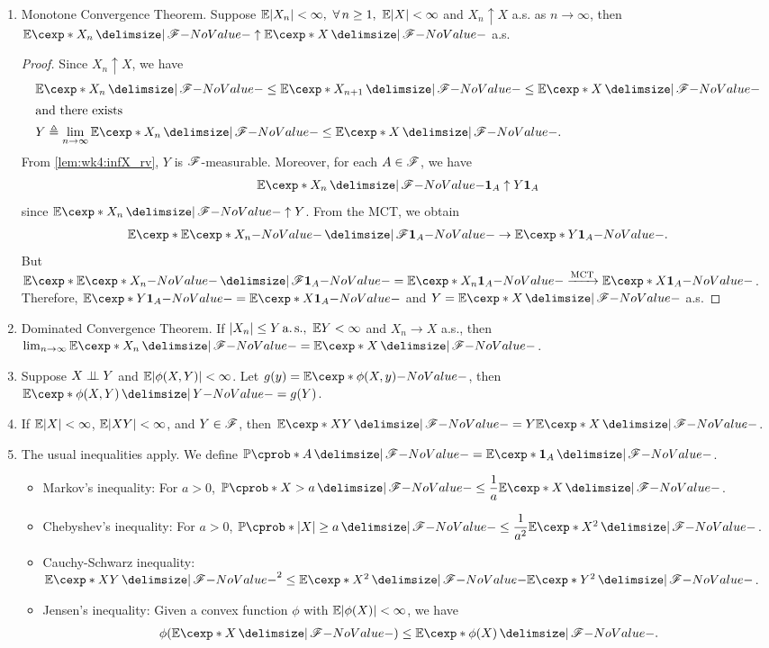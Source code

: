 \documentclass[12pt]{article}
\begin{document}
\begin{enumerate}[1.]
\item Monotone Convergence Theorem. Suppose $\E |X_n|<\infty,\ \forall n\geq 1,\ \E|X|<\infty$ and $X_n \uparrow X$ a.s. as $n \to \infty$, then $\E[X_n \given \scF] \uparrow \E[X \given \scF]$ a.s.
\begin{proof}
Since $X_n \uparrow X$, we have
\begin{align*}
&\E[X_n \given \scF]\leq \E[X_{n+1} \given \scF]\leq \E[X \given \scF]\\
\intertext{and there exists}
&Y\triangleq \lim_{n\to \infty} \E [X_n \given \scF]\leq \E [X \given \scF].
\end{align*}
From \cref{lem:wk4:infX_rv}, $Y$ is $\mathscr{F}$-measurable. Moreover, for each $A\in\mathscr{F}$, we have
\begin{align*}
\E[X_n \given \scF]\indicatore{A} \uparrow  Y\indicatore{A}
\end{align*}
since $\E[X_n \given \scF] \uparrow Y$. From the MCT, we obtain
\begin{align*}
\E[\E[X_n]{\scF}\indicatore{A}] \to \E[Y\indicatore{A}].
\end{align*}
But $\E[\E[X_n]{\scF}\indicatore{A}]=\E[X_n\indicatore{A}] \xrightarrow{\text{MCT}} \E[X\indicatore{A}]$. Therefore, $\E[Y\indicatore{A}]=\E[X\indicatore{A}]$ and $Y=\E[X \given \scF]$ a.s. 
\end{proof}

\item Dominated Convergence Theorem. If $|X_n|\leq Y \as,\ \E Y<\infty$ and $X_n \to X$ a.s., then $\lim_{n\to \infty}\E[X_n \given \scF]=\E[X \given \scF]$.

\item Suppose $X\independent Y$ and $\E|\phi(X,Y)|<\infty$. Let $g(y)=\E [\phi(X,y)]$, then $\E[\phi(X,Y) \given Y]=g(Y)$.

\item If $\E|X|<\infty$, $\E|XY|<\infty$, and $Y\in \mathscr{F}$, then $\E[XY \given \scF]=Y\E[X \given \scF]$.
 
\item The usual inequalities apply. We define $\P(A \given \scF) = \E[\indicatore{A} \given \scF]$.
\begin{itemize}
	\item Markov's inequality: For $a>0$, $\P(X>a \given \scF) \leq \odfrac{a}\E[X \given \scF]$.
	\item Chebyshev's inequality: For $a>0$, $\P({|X|\geq a} \given \scF) \leq \odfrac{a^2}\E[X^2 \given \scF]$.
	\item Cauchy-Schwarz inequality: $\E[XY \given \scF]^2 \leq \E[X^2 \given \scF] \E[Y^2 \given \scF]$.
	\item Jensen's inequality: Given a convex function $\phi$ with $\E|\phi(X)|<\infty$, we have 
	\begin{align*}
	\phi(\E[X \given \scF]) \leq \E[\phi(X) \given \scF].
	\end{align*}
\end{itemize}

\end{enumerate}
\end{document}
